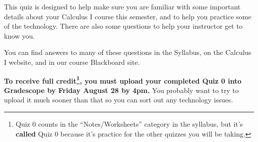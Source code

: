 \documentclass[12pt]{article}
\renewcommand{\emph}[1]{\textsf{\textbf{#1}}}
\begin{document}
This quiz is designed to help make sure you are familiar with some important details about your Calculus I course this semester, and to help you practice some of the technology. There are also some questions to help your instructor get to know you.

You can find answers to many of these questions in the Syllabus, on the Calculus I website, and in our course Blackboard site.

\textbf{To receive full credit\footnote{Quiz 0 counts in the ``Notes/Worksheets'' category in the syllabus, but it's \emph{called} Quiz 0 because it's practice for the other quizzes you will be taking.}, you must upload your completed Quiz 0 into Gradescope by Friday August 28 by 4pm.} You probably want to try to upload it much sooner than that so you can sort out any technology issues.
\end{document}
